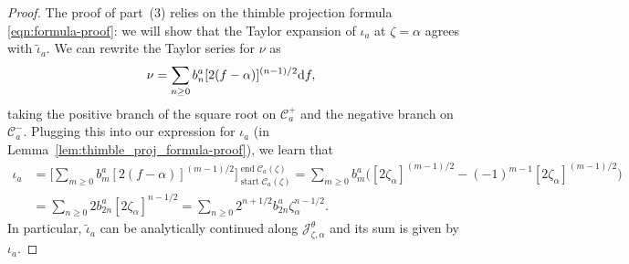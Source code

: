 \documentclass[10pt,a4paper]{amsart}
\newcommand{\series}[1]{\tilde{#1}}
\numberwithin{equation}{section}
\begin{document}
\begin{proof}
The proof of part~(3) relies on the thimble projection formula \eqref{eqn:formula-proof}: we will show that the Taylor expansion of $\iota_a$ at $\zeta=\alpha$ agrees with $\series{\iota}_a$. We can rewrite the Taylor series for $\nu$ as
\begin{align*}
\nu & = \sum_{n \ge 0} b_n^a [2(f - \alpha)]^{(n - 1)/2} {\rm d}f,
\end{align*}
taking the positive branch of the square root on $\mathcal{C}^+_a$ and the negative branch on $\mathcal{C}^-_a$. Plugging this into our expression for $\iota_a$ (in Lemma~\ref{lem:thimble_proj_formula-proof}), we learn that
\begin{align*}
\iota_a & = \bigg[ \sum_{m \ge 0} b_m^a [2(f - \alpha)]^{(m - 1)/2} \bigg]_{\operatorname{start} \mathcal{C}_a(\zeta)}^{\operatorname{end} \mathcal{C}_a(\zeta)} = \sum_{m \ge 0} b_m^a \bigl( [2\zeta_\alpha]^{(m - 1)/2} - (-1)^{m-1}[2\zeta_\alpha]^{(m - 1)/2} \bigr) \\
& = \sum_{n \ge 0} 2 b_{2n}^a [2\zeta_\alpha]^{n - 1/2} = \sum_{n \ge 0} 2^{n+1/2} b_{2n}^a \zeta_\alpha^{n - 1/2}.
\end{align*}
In particular, $\series{\iota}_a$ can be analytically continued along $\mathcal{J}_{\zeta,\alpha}^\theta$ and its sum is given by~$\iota_a$.
\end{proof}
\end{document}
